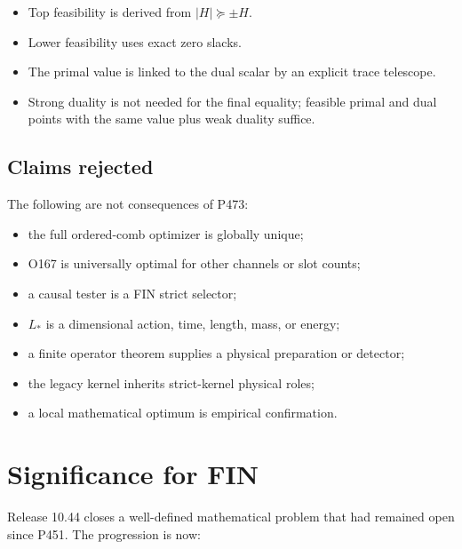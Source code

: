 \documentclass[11pt,a4paper,openany]{report}
\begin{document}
\begin{itemize}
\item 
Top feasibility is derived from \(|H|\succeq\pm H\).

\item 
Lower feasibility uses exact zero slacks.

\item 
The primal value is linked to the dual scalar by an explicit trace telescope.

\item 
Strong duality is not needed for the final equality; feasible primal and dual points with the same value plus weak duality suffice.

\end{itemize}

\section{Claims rejected}

The following are not consequences of P473:

\begin{itemize}
\item 
the full ordered-comb optimizer is globally unique;

\item 
O167 is universally optimal for other channels or slot counts;

\item 
a causal tester is a FIN strict selector;

\item 
\(L_*\) is a dimensional action, time, length, mass, or energy;

\item 
a finite operator theorem supplies a physical preparation or detector;

\item 
the legacy kernel inherits strict-kernel physical roles;

\item 
a local mathematical optimum is empirical confirmation.

\end{itemize}

\chapter{Significance for FIN}

Release 10.44 closes a well-defined mathematical problem that had remained open since P451. The progression is now:
\end{document}
